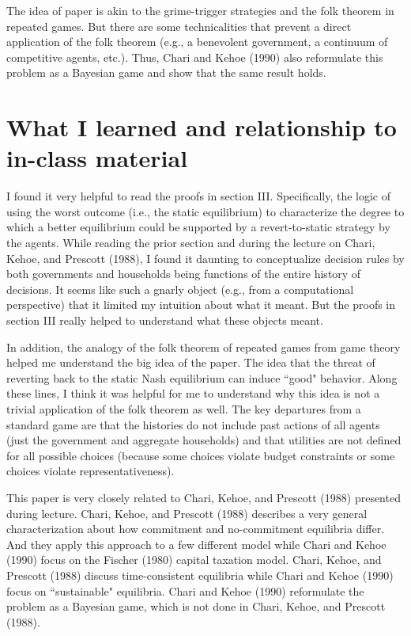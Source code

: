 \documentclass{article}
\begin{document}
The idea of paper is akin to the grime-trigger strategies and the folk theorem in repeated games. But there are some technicalities that prevent a direct application of the folk theorem (e.g., a benevolent government, a continuum of competitive agents, etc.).  Thus, Chari and Kehoe (1990) also reformulate this problem as a Bayesian game and show that the same result holds.

\section{What I learned and relationship to in-class material}

I found it very helpful to read the proofs in section III.  Specifically, the logic of using the worst outcome (i.e., the static equilibrium) to characterize the degree to which a better equilibrium could be supported by a revert-to-static strategy by the agents.  While reading the prior section and during the lecture on Chari, Kehoe, and Prescott (1988), I found it daunting to conceptualize decision rules by both governments and households being functions of the entire history of decisions. It seems like such a gnarly object (e.g., from a computational perspective) that it limited my intuition about what it meant. But the proofs in section III really helped to understand what these objects meant.

In addition, the analogy of the folk theorem of repeated games from game theory helped me understand the big idea of the paper. The idea that the threat of reverting back to the static Nash equilibrium can induce ``good" behavior. Along these lines, I think it was helpful for me to understand why this idea is not a trivial application of the folk theorem as well. The key departures from a standard game are that the histories do not include past actions of all agents (just the government and aggregate households) and that utilities are not defined for all possible choices (because some choices violate budget constraints or some choices violate representativeness).

This paper is very closely related to Chari, Kehoe, and Prescott (1988) presented during lecture. Chari, Kehoe, and Prescott (1988) describes a very general characterization about how commitment and no-commitment equilibria differ. And they apply this approach to a few different model while Chari and Kehoe (1990) focus on the Fischer (1980) capital taxation model.  Chari, Kehoe, and Prescott (1988) discuss time-consistent equilibria while Chari and Kehoe (1990) focus on ``sustainable" equilibria. Chari and Kehoe (1990) reformulate the problem as a Bayesian game, which is not done in Chari, Kehoe, and Prescott (1988).
\end{document}
